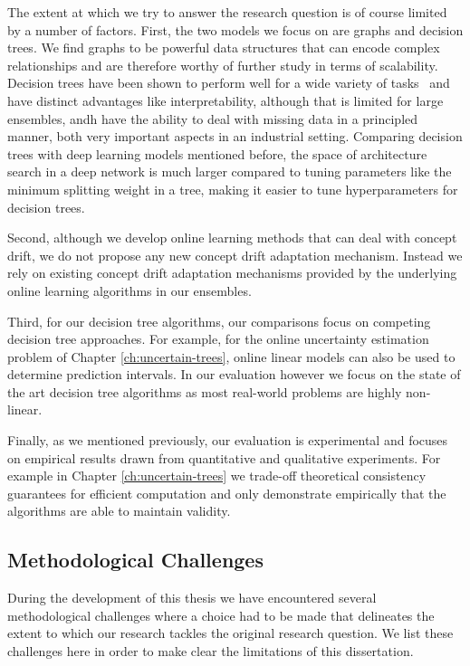 The extent at which we try to answer the research question is of course limited by
a number of factors. First, the two models we focus on are graphs and decision
trees. We find graphs to be powerful data structures that can encode complex
relationships and are therefore worthy of further study in terms of scalability.
Decision trees have been shown to perform well for a wide variety of tasks~\cite{hundreds-classifiers}
and have distinct advantages like interpretability, although that is limited
for large ensembles, andh have the ability to deal with missing data in a principled
manner, both very important aspects in an industrial setting.
Comparing decision trees with deep learning models mentioned before, the space
of architecture search in a deep network is much larger compared to tuning parameters like
the minimum splitting weight in a tree, making it easier to tune hyperparameters
for decision trees.

Second, although we develop online learning methods that can deal
with concept drift, we do not propose any new concept drift adaptation
mechanism. Instead we rely on existing concept drift adaptation mechanisms
provided by the underlying online learning algorithms in our ensembles.

Third, for our decision tree algorithms, our comparisons focus on
competing decision tree approaches. For example, for the online uncertainty
estimation problem of Chapter \ref{ch:uncertain-trees}, online linear
models can also be used to determine prediction intervals. In our evaluation
however we focus on the state of the art decision tree algorithms as
most real-world problems are highly non-linear.

Finally, as we mentioned previously, our evaluation is experimental
and focuses on empirical results drawn from quantitative and qualitative
experiments. For example in Chapter \ref{ch:uncertain-trees} we trade-off
theoretical consistency guarantees for efficient computation
and only demonstrate empirically that the algorithms are able to maintain validity.

\subsection*{Methodological Challenges}

During the development of this thesis we have encountered several methodological
challenges where a choice had to be made that delineates the extent to which
our research tackles the original research question. We list these challenges
here in order to make clear the limitations of this dissertation.

